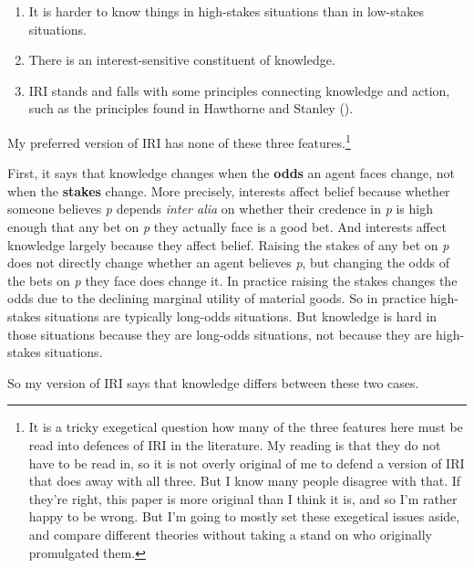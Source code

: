 \documentclass[
  10pt,
  letterpaper,
  DIV=11,
  numbers=noendperiod,
  twoside]{scrartcl}
\providecommand{\tightlist}{%
  \setlength{\itemsep}{0pt}\setlength{\parskip}{0pt}}\usepackage{longtable,booktabs,array}
\begin{document}
\begin{enumerate}
\def\labelenumi{\arabic{enumi}.}
\tightlist
\item
  It is harder to know things in high-stakes situations than in
  low-stakes situations.
\item
  There is an interest-sensitive constituent of knowledge.
\item
  IRI stands and falls with some principles connecting knowledge and
  action, such as the principles found in Hawthorne and Stanley
  ().
\end{enumerate}

My preferred version of IRI has none of these three features.\footnote{It
  is a tricky exegetical question how many of the three features here
  must be read into defences of IRI in the literature. My reading is
  that they do not have to be read in, so it is not overly original of
  me to defend a version of IRI that does away with all three. But I
  know many people disagree with that. If they're right, this paper is
  more original than I think it is, and so I'm rather happy to be wrong.
  But I'm going to mostly set these exegetical issues aside, and compare
  different theories without taking a stand on who originally
  promulgated them.}

First, it says that knowledge changes when the \textbf{odds} an agent
faces change, not when the \textbf{stakes} change. More precisely,
interests affect belief because whether someone believes \emph{p}
depends \emph{inter alia} on whether their credence in \emph{p} is high
enough that any bet on \emph{p} they actually face is a good bet. And
interests affect knowledge largely because they affect belief. Raising
the stakes of any bet on \emph{p} does not directly change whether an
agent believes \emph{p}, but changing the odds of the bets on \emph{p}
they face does change it. In practice raising the stakes changes the
odds due to the declining marginal utility of material goods. So in
practice high-stakes situations are typically long-odds situations. But
knowledge is hard in those situations because they are long-odds
situations, not because they are high-stakes situations.

So my version of IRI says that knowledge differs between these two
cases.
\end{document}
